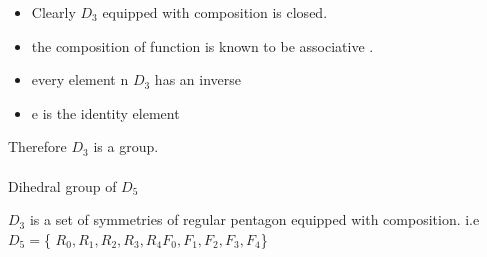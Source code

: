 \documentclass{article}
\begin{document}
\begin{itemize}
    \item Clearly $D_3$ equipped with composition is closed.
    \item the composition of function is known to be associative .
    \item every element n $D_3$ has an inverse 
\item e is the identity element 
\end{itemize}
 
\Large{Therefore $D_3$ is a group.}\\\\


\Large{Dihedral group of $D_5$}

$D_3$ is a set of symmetries of regular pentagon equipped with composition.
i.e $D_5=$\{ $R_0,R_1,R_2,R_3,R_4F_0,F_1,F_2,F_3,F_4$\}


\newcommand{\pentagonDraw}[6]{
\begin{tikzpicture}

\node (p) [draw,rotate=70,minimum size=3cm,regular polygon, regular polygon sides=#1] at (0,-0.4) {};
\tikzstyle{every node}=[draw,shape=circle,color=black];
\node[anchor=1*(360/9)]at(p.corner 1){$V_#2$};
\node[anchor=2*(360/9)]at(p.corner 2){$V_#3$};
\node[anchor=3*(360/9)]at(p.corner 3){$V_#4$};
\node[anchor=4*(360/9)]at(p.corner 4){$V_#5$};
\node[anchor=5*(360/9)]at(p.corner 5){$V_#6$};
\end{tikzpicture}
}
\end{document}
